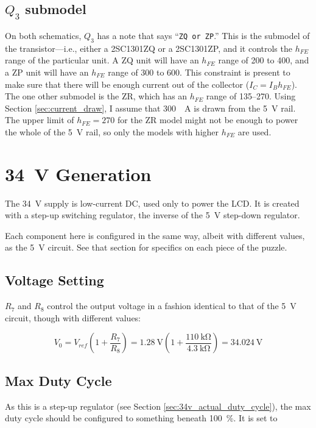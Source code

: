 \documentclass{article}
\newcommand{\model}{\textsf}
\begin{document}
\subsection{$Q_3$ submodel}
\label{sec:q3_submodel}
On both schematics, $Q_3$ has a note that says ``\texttt{ZQ or ZP}.''
This is the submodel of the transistor---i.e., either a
\model{2SC1301ZQ} or a \model{2SC1301ZP}, and it controls the $h_{FE}$
range of the particular unit. A \model{ZQ} unit will have an $h_{FE}$
range of 200 to 400, and a \model{ZP} unit will have an $h_{FE}$
range of 300 to 600. This constraint is present to make sure that
there will be enough current out of the collector ($I_C =
I_Bh_{FE}$). The one other submodel is the \model{ZR}, which has an
$h_{FE}$ range of 135--270. Using Section \ref{sec:current_draw}, I
assume that \qty{300}{\milli{}A} is drawn from the \qty{5}{\volt}
rail. The upper limit of $h_{FE} = 270$ for the \model{ZR} model
might not be enough to power the whole of the \qty{5}{\volt} rail, so
only the models with higher $h_{FE}$ are used.

\section{\qty{34}{\volt} Generation}
The \qty{34}{\volt} supply is low-current DC, used only to power the
LCD. It is created with a step-up switching regulator, the inverse of
the \qty{5}{\volt} step-down regulator.

Each component here is configured in the same way, albeit with
different values, as the \qty{5}{\volt} circuit. See that section for
specifics on each piece of the puzzle.

\subsection{Voltage Setting}
$R_7$ and $R_8$ control the output voltage in a fashion identical to
that of the \qty{5}{\volt} circuit, though with different values:

\begin{displaymath}
  V_0 = V_{ref}\left(1+\frac{R_7}{R_8}\right) =
  \qty{1.28}{\volt}\left(1+\frac{\qty{110}{\kilo\ohm}}{\qty{4.3}{\kilo\ohm}}\right)
  = \qty{34.024}{\volt}
\end{displaymath}

\subsection{Max Duty Cycle}
As this is a step-up regulator (see Section
\ref{sec:34v_actual_duty_cycle}), the max duty cycle should be
configured to something beneath \qty{100}{\%}. It is set to
\end{document}
